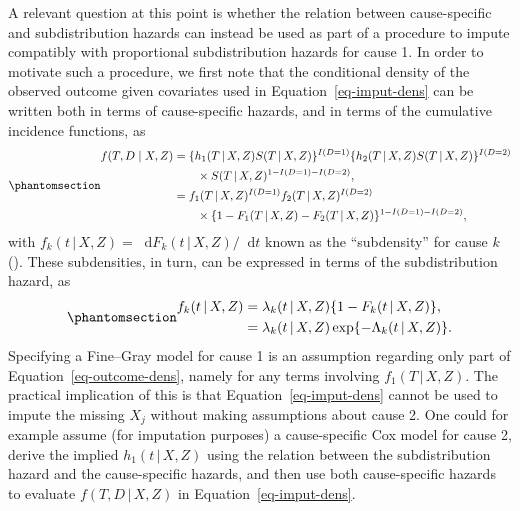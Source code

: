 \documentclass[
  letterpaper,
  DIV=11,
  numbers=noendperiod]{scrreprt}
\newcommand{\given}{\,|\,}
\newcommand\diff{\mathop{}\!\mathrm{d}}
\begin{document}
A relevant question at this point is whether the relation between
cause-specific and subdistribution hazards can instead be used as part
of a procedure to impute compatibly with proportional subdistribution
hazards for cause 1. In order to motivate such a procedure, we first
note that the conditional density of the observed outcome given
covariates used in Equation~\ref{eq-imput-dens} can be written both in
terms of cause-specific hazards, and in terms of the cumulative
incidence functions, as
\begin{equation}\phantomsection\label{eq-outcome-dens}{
\begin{aligned}
    f(T, D \mid X, Z) &= \{h_1(T \given X, Z)S(T \given X, Z)\}^{I(D = 1)}\{h_2(T \given X, Z)S(T \given X, Z)\}^{I(D = 2)}  \\
    &\qquad \times S(T \given X, Z)^{1 - I(D = 1) - I(D = 2)}, \\
    &= f_1(T \given X, Z)^{I(D = 1)}f_2(T \given X, Z)^{I(D = 2)}  \\
    &\qquad \times \{1 - F_1(T \given X,Z) - F_2(T \given X, Z)\}^{1 - I(D = 1) - I(D = 2)}, 
\end{aligned}
}\end{equation} with
\(f_k(t \given X, Z) = \diff F_k(t \given X, Z) / \diff t\) known as the
``subdensity'' for cause \(k\)
(). These
subdensities, in turn, can be expressed in terms of the subdistribution
hazard, as \begin{equation}\phantomsection\label{eq-subdens-to-subdist}{
\begin{aligned}
  f_k(t \given X, Z) &= \lambda_k(t \given X, Z)\{1 - F_k(t \given X, Z)\}, \nonumber \\
    &=  \lambda_k(t \given X, Z)\exp\{- \Lambda_k(t \given X, Z)\}.
\end{aligned}
}\end{equation} Specifying a Fine--Gray model for cause 1 is an
assumption regarding only part of Equation~\ref{eq-outcome-dens}, namely
for any terms involving \(f_1(T \given X, Z)\). The practical
implication of this is that Equation~\ref{eq-imput-dens} cannot be used
to impute the missing \(X_j\) without making assumptions about cause 2.
One could for example assume (for imputation purposes) a cause-specific
Cox model for cause 2, derive the implied \(h_1(t \given X, Z)\) using
the relation between the subdistribution hazard and the cause-specific
hazards, and then use both cause-specific hazards to evaluate
\(f(T, D \given X, Z)\) in Equation~\ref{eq-imput-dens}.
\end{document}
